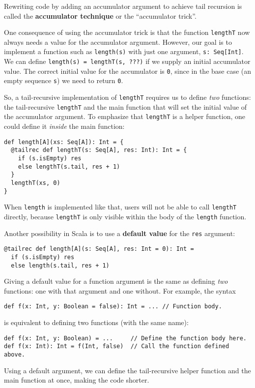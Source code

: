 Rewriting code by adding an accumulator argument to achieve tail recursion
is called the \textbf{accumulator technique} or the \textsf{``}accumulator
trick\textsf{''}.

One consequence of using the accumulator trick is that the function
\lstinline!lengthT! now always needs a value for the accumulator
argument. However, our goal is to implement a function such as \lstinline!length(s)!
with just one argument, \lstinline!s: Seq[Int]!. We can define \lstinline!length(s) = lengthT(s, ???)!
if we supply an initial accumulator value. The correct initial value
for the accumulator is \lstinline!0!, since in the base case (an
empty sequence \lstinline!s!) we need to return \lstinline!0!.

So, a tail-recursive implementation of \lstinline!lengthT! requires
us to define \emph{two} functions: the tail-recursive \lstinline!lengthT!
and the main function that will set the initial value of the accumulator
argument. To emphasize that \lstinline!lengthT! is a helper function,
one could define it \emph{inside} the main function:
\begin{lstlisting}
def length[A](xs: Seq[A]): Int = {
  @tailrec def lengthT(s: Seq[A], res: Int): Int = {
    if (s.isEmpty) res
    else lengthT(s.tail, res + 1)
  }
  lengthT(xs, 0)
}
\end{lstlisting}
When \lstinline!length! is implemented like that, users will not
be able to call \lstinline!lengthT! directly, because \lstinline!lengthT!
is only visible within the body of the \lstinline!length! function.

Another possibility in Scala is to use a \textbf{default value}
for the \lstinline!res! argument:
\begin{lstlisting}
@tailrec def length[A](s: Seq[A], res: Int = 0): Int = 
  if (s.isEmpty) res
  else length(s.tail, res + 1)
\end{lstlisting}
Giving a default value for a function argument is the same as defining
\emph{two} functions: one with that argument and one without. For
example, the syntax
\begin{lstlisting}
def f(x: Int, y: Boolean = false): Int = ... // Function body.
\end{lstlisting}
is equivalent to defining two functions (with the same name):
\begin{lstlisting}
def f(x: Int, y: Boolean) = ...     // Define the function body here.
def f(x: Int): Int = f(Int, false)  // Call the function defined above.
\end{lstlisting}
Using a default argument, we can define the tail-recursive helper
function and the main function at once, making the code shorter.

